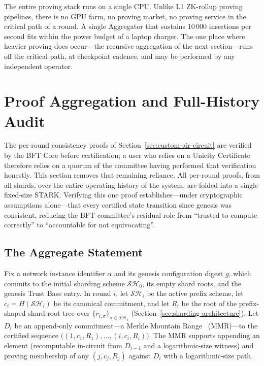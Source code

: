 \documentclass[11pt]{article}
\begin{document}
The entire proving stack runs on a single CPU. Unlike L1 ZK-rollup proving pipelines, there is no GPU farm, no proving market, no proving service in the critical path of a round. A single Aggregator that sustains $10\,000$ insertions per second fits within the power budget of a laptop charger. The one place where heavier proving does occur---the recursive aggregation of the next section---runs off the critical path, at checkpoint cadence, and may be performed by any independent operator.


\section{Proof Aggregation and Full-History Audit}
\label{sec:aggregation-audit}

The per-round consistency proofs of Section~\ref{sec:custom-air-circuit} are verified by the BFT Core before certification; a user who relies on a Unicity Certificate therefore relies on a quorum of the committee having performed that verification honestly. This section removes that remaining reliance. All per-round proofs, from all shards, over the entire operating history of the system, are folded into a single fixed-size STARK. Verifying this one proof establishes---under cryptographic assumptions alone---that every certified state transition since genesis was consistent, reducing the BFT committee's residual role from ``trusted to compute correctly'' to ``accountable for not equivocating''.

\subsection{The Aggregate Statement}
\label{sec:aggregate-statement}

Fix a network instance identifier $\alpha$ and its genesis configuration digest $g$, which commits to the initial sharding scheme $\mathcal{SH}_0$, its empty shard roots, and the genesis Trust Base entry. In round $i$, let $\mathcal{SH}_i$ be the active prefix scheme, let $c_i=H(\mathcal{SH}_i)$ be its canonical commitment, and let $R_i$ be the root of the prefix-shaped shard-root tree over $\{r_{i,\sigma}\}_{\sigma\in\mathcal{SH}_i}$ (Section~\ref{sec:sharding-architecture}). Let $D_i$ be an append-only commitment---a Merkle Mountain Range~\cite{mmr} (MMR)---to the certified sequence $\big((1,c_1,R_1),\ldots,(i,c_i,R_i)\big)$. The MMR supports appending an element (recomputable in-circuit from $D_{i-1}$ and a logarithmic-size witness) and proving membership of any $(j,c_j,R_j)$ against $D_i$ with a logarithmic-size path.
\end{document}
